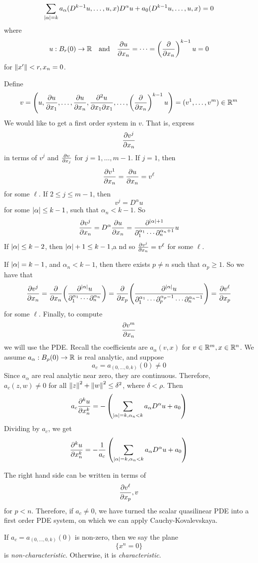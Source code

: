 \documentclass{article}
\begin{document}
\[\sum_{\abs{\alpha} = k}a_\alpha(D^{k-1}u, \dots, u, x)D^\alpha u + a_0(D^{k-1}u, \dots, u, x) = 0\]
where
\[u : B_r(0) \to \R \qqtext{and} \pdv{u}{x_n} = \dots = \left(\pdv{x_n}\right)^{k-1}u = 0\]
for \(\norm{x'} < r, x_n = 0\).

Define
\[v = \left(u, \pdv{u}{x_1}, \dots, \pdv{u}{x_n}, \pdv[2]{u}{x_1}{x_1}, \dots, \left(\pdv{x_n}\right)^{k-1}u\right) = (v^1, \dots, v^m) \in \mathbb{R}^m\]
We would like to get a first order system in \(v\). That is, express
\[\pdv{v^j}{x_n}\]
in terms of \(v^j\) and \(\pdv{v}{x_j}\) for \(j = 1, \dots, m-1\). If \(j = 1\), then
\[\pdv{v^1}{x_n} = \pdv{u}{x_n} = v^\ell\]
for some \(\ell\). If \(2 \le j \le m-1\), then
\[v^j = D^\alpha u\]
for some \(\abs{\alpha} \le k-1\), such that \(\alpha_n < k-1\). So
\[\pdv{v^j}{x_n} = D^\alpha \pdv{u}{x_n} = \frac{\partial^{\abs{\alpha} + 1}}{\partial_1^{\alpha_1}\cdots \partial_n^{\alpha_n + 1}}u\]
If \(\abs{\alpha} \le k-2\), then \(\abs{\alpha} + 1 \le k-1\),a nd so \(\pdv{v^j}{x_n} = v^\ell\) for some \(\ell\).

If \(\abs{\alpha} = k-1\), and \(\alpha_n < k-1\), then there exists \(p \ne n\) such that \(\alpha_p \ge 1\). So we have that
\[\pdv{v^j}{x_n} = \pdv{x_n}(\frac{\partial^{\abs{\alpha}}u}{\partial_1^{\alpha_1}\cdots\partial_n^{\alpha_n}}) = \pdv{x_p}(\frac{\partial^{\abs{\alpha}}u}{\partial_1^{\alpha_1}\cdots \partial_p^{\alpha_p - 1}\cdots \partial_n^{\alpha_n - 1}}) = \pdv{v^\ell}{x_p}\]
for some \(\ell\). Finally, to compute
\[\pdv{v^m}{x_n}\]
we will use the PDE. Recall the coefficients are \(a_\alpha(v, x)\) for \(v \in \mathbb{R}^m, x \in \mathbb{R}^n\). We assume \(a_\alpha : B_\rho(0) \to \mathbb{R}\) is real analytic, and suppose
\[a_c = a_{(0, \dots, 0, k)}(0) \ne 0\]
Since \(a_\alpha\) are real analytic near zero, they are continuous. Therefore, \(a_c(z, w) \ne 0\) for all \(\norm{z}^2 + \norm{w}^2 \le \delta^2\), where \(\delta < \rho\). Then
\[a_c \frac{\partial^k u}{\partial x_n^k} = -\left(\sum_{\abs{\alpha} = k, \alpha_n < k} a_\alpha D^\alpha u + a_0\right)\]
Dividing by \(a_c\), we get
\[\frac{\partial^k u}{\partial x_n^k} = -\frac{1}{a_c}\left(\sum_{\abs{\alpha} = k, \alpha_n < k} a_\alpha D^\alpha u + a_0\right)\]

The right hand side can be written in terms of
\[\pdv{v^\ell}{x_p}, v\]
for \(p < n\). Therefore, if \(a_c \ne 0\), we have turned the scalar quasilinear PDE into a first order PDE system, on which we can apply Cauchy-Kovalevskaya.

\begin{definition}
    If \(a_c = a_{(0, \dots, 0, k)}(0)\) is non-zero, then we say the plane
    \[\{x^n = 0\}\]
    is \emph{non-characteristic}. Otherwise, it is \emph{characteristic}.
\end{definition}
\end{document}
